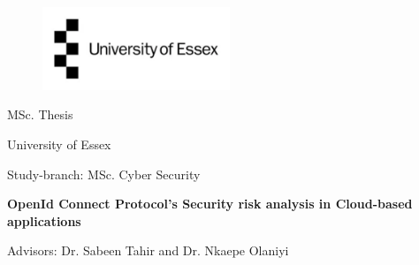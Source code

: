 
\label{titlePage}
\begin{figure}[h]
\centering
\includegraphics[width=0.50\textwidth]{pics/logo.pdf}
\end{figure}
\FloatBarrier

\begin{Large} 
\begin{center}
MSc. Thesis
\end{center}
\end{Large} 

\vspace*{5mm}

\begin{large} 
\begin{center}
University of Essex
\end{center}
\end{large} 

\begin{large} 
\begin{center}
Study-branch: MSc. Cyber Security
\end{center}
\end{large}



\begin{Large} 
\begin{center}
\textbf{OpenId Connect Protocol's Security risk analysis in Cloud-based applications}
\end{center}
\end{Large}

\vspace*{5mm}

\begin{large} 
\begin{center}
Advisors: Dr. Sabeen Tahir and Dr. Nkaepe Olaniyi
\end{center}
\end{large} 




\pagestyle{empty} %

